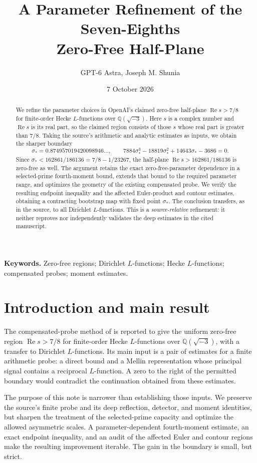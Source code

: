 \documentclass[11pt,a4paper]{article}
\title{A Parameter Refinement of the Seven-Eighths\\Zero-Free Half-Plane}
\author{GPT-6 Astra, Joseph M. Shunia}
\date{7 October 2026}
\numberwithin{equation}{section}
\theoremstyle{remark}
\newcommand{\Rea}{\operatorname{Re}}
\begin{document}
\maketitle
\begin{abstract}
We refine the parameter choices in OpenAI's claimed zero-free half-plane
$\Rea s>7/8$ for finite-order Hecke $L$-functions over
$\mathbb Q(\sqrt{-3})$. Here $s$ is a complex number and $\Rea s$ is its
real part, so the claimed region consists of those $s$ whose real part
is greater than $7/8$. Taking the source's arithmetic and analytic
estimates as inputs, we obtain the sharper boundary
\[
 \sigma_*=0.874957019420098946\ldots,
 \qquad
 7884\sigma_*^3-18819\sigma_*^2+14643\sigma_*-3686=0.
\]
Since $\sigma_*<162861/186136=7/8-1/23267$, the half-plane
$\Rea s>162861/186136$ is zero-free as well.
The argument retains the exact zero-free-parameter dependence in a
selected-prime fourth-moment bound, extends that bound to the required
parameter range, and optimizes the geometry of the existing compensated
probe. We verify the resulting endpoint inequality and the affected
Euler-product and contour estimates, obtaining a contracting bootstrap
map with fixed point $\sigma_*$. The conclusion transfers, as in the
source, to all Dirichlet $L$-functions. This is a \emph{source-relative}
refinement: it neither reproves nor independently validates the deep
estimates in the cited manuscript.
\end{abstract}

\noindent\textbf{Keywords.} Zero-free regions; Dirichlet $L$-functions;
Hecke $L$-functions; compensated probes; moment estimates.

\section{Introduction and main result}
\label{sec:statement}

The compensated-probe method of \cite{OA} is reported to give the
uniform zero-free region $\Rea s>7/8$ for finite-order Hecke
$L$-functions over $\mathbb Q(\sqrt{-3})$, with a transfer to Dirichlet
$L$-functions. Its main input is a pair of estimates for a finite
arithmetic probe: a direct bound and a Mellin representation whose
principal signal contains a reciprocal $L$-function. A zero to the
right of the permitted boundary would contradict the continuation
obtained from these estimates.

The purpose of this note is narrower than establishing those inputs.
We preserve the source's finite probe and its deep reflection, detector,
and moment identities, but sharpen the treatment of the selected-prime
capacity and optimize the allowed asymmetric scales. A parameter-dependent
fourth-moment estimate, an exact endpoint inequality, and an audit of the
affected Euler and contour regions make the resulting improvement
iterable. The gain in the boundary is small, but strict.
\end{document}

